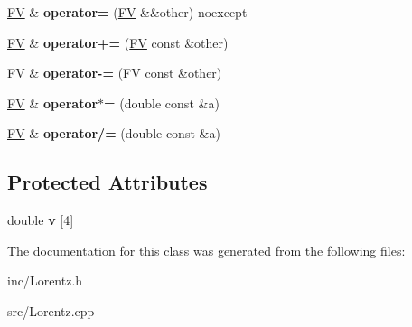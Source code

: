 \begin{DoxyCompactItemize}
\item 
\hypertarget{classFV_ac95050de7df77088ad31b1c755e2fe33}{\hyperlink{classFV}{F\-V} \& {\bfseries operator=} (\hyperlink{classFV}{F\-V} \&\&other) noexcept}\label{classFV_ac95050de7df77088ad31b1c755e2fe33}

\item 
\hypertarget{classFV_ac30a0c8c757d2e5dbd74131f569f48db}{\hyperlink{classFV}{F\-V} \& {\bfseries operator+=} (\hyperlink{classFV}{F\-V} const \&other)}\label{classFV_ac30a0c8c757d2e5dbd74131f569f48db}

\item 
\hypertarget{classFV_a32a55d4f37e616b0b043282a201aa0f6}{\hyperlink{classFV}{F\-V} \& {\bfseries operator-\/=} (\hyperlink{classFV}{F\-V} const \&other)}\label{classFV_a32a55d4f37e616b0b043282a201aa0f6}

\item 
\hypertarget{classFV_ac50969de8023081218ac2480f4403a4d}{\hyperlink{classFV}{F\-V} \& {\bfseries operator$\ast$=} (double const \&a)}\label{classFV_ac50969de8023081218ac2480f4403a4d}

\item 
\hypertarget{classFV_a8d74f60b130edb26fd62c590ea5ecfce}{\hyperlink{classFV}{F\-V} \& {\bfseries operator/=} (double const \&a)}\label{classFV_a8d74f60b130edb26fd62c590ea5ecfce}

\end{DoxyCompactItemize}
\subsection*{Protected Attributes}
\begin{DoxyCompactItemize}
\item 
\hypertarget{classFV_a909196132ec1cd190f8c01546ea5bced}{double {\bfseries v} \mbox{[}4\mbox{]}}\label{classFV_a909196132ec1cd190f8c01546ea5bced}

\end{DoxyCompactItemize}


The documentation for this class was generated from the following files\-:\begin{DoxyCompactItemize}
\item 
inc/Lorentz.\-h\item 
src/Lorentz.\-cpp\end{DoxyCompactItemize}
